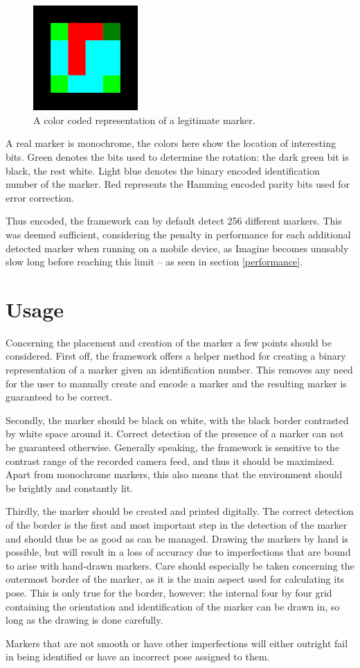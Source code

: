 \begin{figure}[H]
	\centering
	\includegraphics[width=4cm]{img/marker_template.png}
	\caption[Template Marker.]{A color coded representation of a legitimate marker.}
	\label{fig:marker_template}
\end{figure}

A real marker is monochrome, the colors here show the location of interesting bits.
Green denotes the bits used to determine the rotation: the dark green bit is black, the rest white.
Light blue denotes the binary encoded identification number of the marker.
Red represents the Hamming encoded parity bits used for error correction.

Thus encoded, the framework can by default detect 256 different markers.
This was deemed sufficient, considering the penalty in performance for each additional detected marker when running on a mobile device, as Imagine becomes unusably slow long before reaching this limit – as seen in section \ref{performance}.

\section{Usage}

Concerning the placement and creation of the marker a few points should be considered.
First off, the framework offers a helper method for creating a binary representation of a marker given an identification number.
This removes any need for the user to manually create and encode a marker and the resulting marker is guaranteed to be correct.

Secondly, the marker should be black on white, with the black border contrasted by white space around it.
Correct detection of the presence of a marker can not be guaranteed otherwise.
Generally speaking, the framework is sensitive to the contrast range of the recorded camera feed, and thus it should be maximized.
Apart from monochrome markers, this also means that the environment should be brightly and constantly lit.

Thirdly, the marker should be created and printed digitally.
The correct detection of the border is the first and most important step in the detection of the marker and should thus be as good as can be managed.
Drawing the markers by hand is possible, but will result in a loss of accuracy due to imperfections that are bound to arise with hand-drawn markers.
Care should especially be taken concerning the outermost border of the marker, as it is the main aspect used for calculating its pose.
This is only true for the border, however: the internal four by four grid containing the orientation and identification of the marker can be drawn in, so long as the drawing is done carefully.

Markers that are not smooth or have other imperfections will either outright fail in being identified or have an incorrect pose assigned to them.
